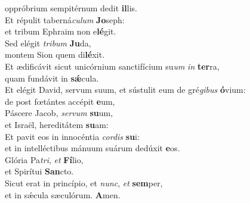 \evenverse oppróbrium sempitérnum dedit \textbf{il}lis.\\
\oddverse Et répulit taberná\textit{cu}\textit{lum} \textbf{Jo}seph:~\*\\
\oddverse et tribum Ephraim non e\textbf{lé}git.\\
\evenverse Sed elégit \textit{tri}\textit{bum} \textbf{Ju}da,~\*\\
\evenverse montem Sion quem di\textbf{lé}xit.\\
\oddverse Et ædificávit sicut unicórnium sanctifícium su\textit{um} \textit{in} \textbf{ter}ra,~\*\\
\oddverse quam fundávit in \textbf{sǽ}cula.\\
\evenverse Et elégit David, servum suum, et sústulit eum de gré\textit{gi}\textit{bus} \textbf{ó}vium:~\*\\
\evenverse de post fœtántes accépit \textbf{e}um,\\
\oddverse Páscere Jacob, \textit{ser}\textit{vum} \textbf{su}um,~\*\\
\oddverse et Israël, hereditátem \textbf{su}am:\\
\evenverse Et pavit eos in innocéntia \textit{cor}\textit{dis} \textbf{su}i:~\*\\
\evenverse et in intelléctibus mánuum suárum dedúxit \textbf{e}os.\\
\oddverse Glória Pa\textit{tri}, \textit{et} \textbf{Fí}lio,~\*\\
\oddverse et Spirítui \textbf{San}cto.\\
\evenverse Sicut erat in princípio, et \textit{nunc}, \textit{et} \textbf{sem}per,~\*\\
\evenverse et in sǽcula sæculórum. \textbf{A}men.\\
